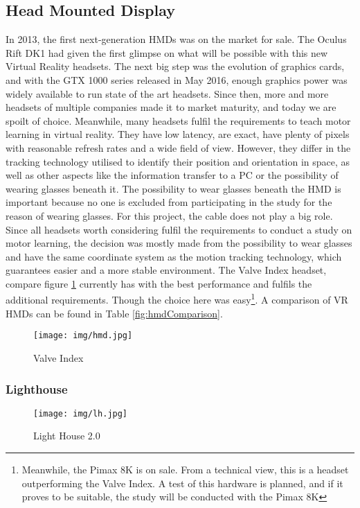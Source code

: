 \subsection{Head Mounted Display}
In 2013, the first next-generation HMDs was on the market for sale. The Oculus Rift DK1 had given the first glimpse on what will be possible with this new Virtual Reality headsets. The next big step was the evolution of graphics cards, and with the GTX 1000 series released in May 2016, enough graphics power was widely available to run state of the art headsets. Since then, more and more headsets of multiple companies made it to market maturity, and today we are spoilt of choice. Meanwhile, many headsets fulfil the requirements to teach motor learning in virtual reality. They have low latency, are exact, have plenty of pixels with reasonable refresh rates and a wide field of view. However, they differ in the tracking technology utilised to identify their position and orientation in space, as well as other aspects like the information transfer to a PC or the possibility of wearing glasses beneath it. The possibility to wear glasses beneath the HMD is important because no one is excluded from participating in the study for the reason of wearing glasses. For this project, the cable does not play a big role. Since all headsets worth considering fulfil the requirements to conduct a study on motor learning, the decision was mostly made from the possibility to wear glasses and have the same coordinate system as the motion tracking technology, which guarantees easier and a more stable environment. The Valve Index headset, compare figure \ref{fig:hmd} currently has with the best performance and fulfils the additional requirements. Though the choice here was easy\footnote{Meanwhile, the Pimax 8K is on sale. From a technical view, this is a headset outperforming the Valve Index. A test of this hardware is planned, and if it proves to be suitable, the study will be conducted with the Pimax 8K}. A comparison of VR HMDs can be found in Table \ref{fig:hmdComparison}.
\begin{figure}
	\centering
	\texttt{[image: img/hmd.jpg]}
	\caption{Valve Index}
	\label{fig:hmd}
\end{figure}

\subsubsection{Lighthouse}
\begin{figure}
	\centering
	\texttt{[image: img/lh.jpg]}
	\caption{Light House 2.0}
	\label{fig:lh}
\end{figure}

